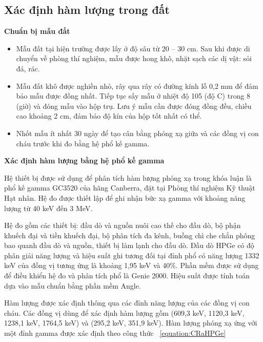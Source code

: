 

\subsection{Xác định hàm lượng  trong đất}

    \textbf{Chuẩn bị mẫu đất} 

    \begin{itemize}
        \item Mẫu đất tại hiện trường được lấy ở độ sâu từ 20 – 30 cm. Sau khi được di chuyển về phòng thí nghiệm, mẫu được hong khô, nhặt sạch các dị vật: sỏi đá, rác. 
        \item   Mẫu đất khô được nghiền nhỏ, rây qua rây có đường kính lỗ 0,2 mm để đảm bảo mẫu được đồng nhất. Tiếp tục sấy mẫu ở nhiệt độ 105 (độ C) trong 8 (giờ) và đóng mẫu vào hộp trụ. Lưu ý mẫu cần được đóng đồng đều, chiều cao khoảng 2 cm, đảm bảo độ kín của hộp tốt nhất có thể.
        \item  Nhốt mẫu ít nhất 30 ngày để tạo cân bằng phóng xạ giữa  và các đồng vị con cháu trước khi đo bằng hệ phổ kế gamma.
    \end{itemize}



    
    \textbf{Xác định hàm lượng  bằng hệ phổ kế gamma}
   
    Hệ thiết bị được sử dụng để phân tích hàm lượng phóng xạ  trong khóa luận là phổ kế gamma GC3520 của hãng Canberra, đặt tại Phòng thí nghiệm Kỹ thuật Hạt nhân. Hệ đo được thiết lập để ghi nhận bức xạ gamma với khoảng năng lượng từ 40 keV đến 3 MeV. 

    Hệ đo gồm các thiết bị: đầu dò và nguồn nuôi cao thế cho đầu dò, bộ phận khuếch đại và tiền khuếch đại, bộ phân tích đa kênh, buồng chì che chắn phông bao quanh đầu dò và nguồn, thiết bị làm lạnh cho đầu dò. Đầu dò HPGe có độ phân giải năng lượng và hiệu suất ghi tương đối tại đỉnh phổ có năng lượng 1332 keV của đồng vị  tương ứng là khoảng 1,95 keV và 40\%. Phần mềm được sử dụng để điều khiển hệ đo và phân tích phổ là Genie 2000. Hiệu suất được tính toán dựa vào mẫu chuẩn bằng phần mềm Angle.

    Hàm lượng  được xác định thông qua các đỉnh năng lượng của các đồng vị con cháu. Các đồng vị dùng để xác định hàm lượng  gồm  (609,3 keV, 1120,3 keV, 1238,1 keV, 1764,5 keV) và  (295,2 keV, 351,9 keV). Hàm lượng phóng xạ ứng với một đỉnh gamma được xác định theo công thức ~\ref{equation:CRaHPGe}

